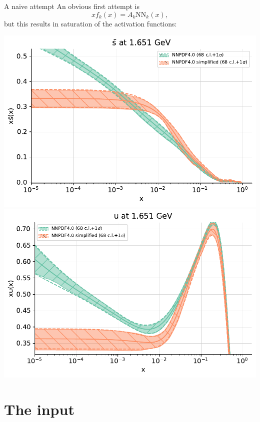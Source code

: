 \documentclass[aspectratio=169, 8pt,t]{beamer}
\begin{document}
\begin{frame}{A naive attempt}
  An obvious first attempt is $$ xf_k(x) = A_k \mathrm{NN}_k(x), $$ but this results in saturation of the activation functions:
  \begin{center}
    \includegraphics[height=0.55\textheight]{pdf_sbar_log_saturated.pdf}
    \includegraphics[height=0.55\textheight]{pdf_u_log_saturated.pdf}
  \end{center}
\end{frame}

\section*{The input}
\end{document}
